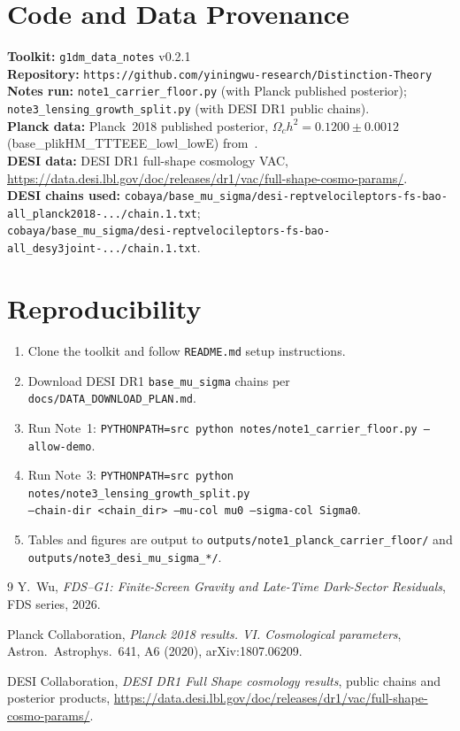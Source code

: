 \documentclass[11pt]{article}
\begin{document}
\section*{Code and Data Provenance}

\noindent\textbf{Toolkit:} \texttt{g1dm\_data\_notes} v0.2.1\\
\textbf{Repository:} \texttt{https://github.com/yiningwu-research/Distinction-Theory}\\
\textbf{Notes run:} \texttt{note1\_carrier\_floor.py} (with Planck published posterior);
\texttt{note3\_lensing\_growth\_split.py} (with DESI DR1 public chains).\\
\textbf{Planck data:} Planck~2018 published posterior,
$\Omega_c h^2 = 0.1200 \pm 0.0012$ (base\_plikHM\_TTTEEE\_lowl\_lowE)
from~\cite{Planck2018}.\\
\textbf{DESI data:} DESI DR1 full-shape cosmology VAC,
\url{https://data.desi.lbl.gov/doc/releases/dr1/vac/full-shape-cosmo-params/}.\\
\textbf{DESI chains used:}
\texttt{cobaya/base\_mu\_sigma/desi-reptvelocileptors-fs-bao-all\_planck2018-.../chain.1.txt};\\
\texttt{cobaya/base\_mu\_sigma/desi-reptvelocileptors-fs-bao-all\_desy3joint-.../chain.1.txt}.

\section*{Reproducibility}

\begin{enumerate}
\item Clone the toolkit and follow \texttt{README.md} setup instructions.
\item Download DESI DR1 \texttt{base\_mu\_sigma} chains per \texttt{docs/DATA\_DOWNLOAD\_PLAN.md}.
\item Run Note~1: \texttt{PYTHONPATH=src python notes/note1\_carrier\_floor.py --allow-demo}.
\item Run Note~3: \texttt{PYTHONPATH=src python notes/note3\_lensing\_growth\_split.py}\\
  \texttt{--chain-dir <chain\_dir> --mu-col mu0 --sigma-col Sigma0}.
\item Tables and figures are output to \texttt{outputs/note1\_planck\_carrier\_floor/} and
  \texttt{outputs/note3\_desi\_mu\_sigma\_*/}.
\end{enumerate}

\begin{thebibliography}{9}
Y.~Wu, \emph{FDS--G1: Finite-Screen Gravity and Late-Time Dark-Sector Residuals},
FDS series, 2026.

Planck Collaboration, \emph{Planck 2018 results. VI. Cosmological parameters},
Astron.\ Astrophys.\ 641, A6 (2020), arXiv:1807.06209.

DESI Collaboration, \emph{DESI DR1 Full Shape cosmology results},
public chains and posterior products,
\url{https://data.desi.lbl.gov/doc/releases/dr1/vac/full-shape-cosmo-params/}.
\end{thebibliography}
\end{document}
